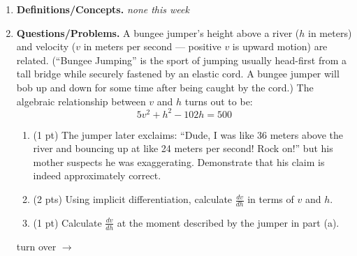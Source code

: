 \documentclass[11pt,letterpaper]{article}
\begin{document}
\begin{enumerate}
\item  \textbf{Definitions/Concepts.} \emph{none this week}

\vspace{1pc}
\item \textbf{Questions/Problems.}  \noindent A bungee jumper's height above a river ($h$ in meters) and velocity ($v$ in meters per
second --- positive $v$ is upward motion) are related. (``Bungee Jumping'' is the sport of jumping usually head-first from a tall
bridge while securely fastened by an elastic cord. A bungee jumper will bob up and down for some time after being caught by the
cord.)  The algebraic relationship between $v$ and $h$ turns out to be:
\[5v^2 + h^2 - 102h = 500\]

\begin{enumerate}
\item (1 pt)  The jumper later exclaims: ``Dude, I was like 36 meters above the river and bouncing up at like 24 meters per second! Rock on!'' but his mother suspects he was exaggerating. Demonstrate that his claim is indeed approximately correct. 

\vspace{3pc}
\item (2 pts)  Using implicit differentiation, calculate $\frac{dv}{dh}$ in terms of $v$ and $h$.

\vspace{5pc}
\item (1 pt)  Calculate $\frac{dv}{dh}$ at the moment described by the jumper in part (a).

\end{enumerate}

\vspace{5pc}
\begin{flushright}
 turn over $\rightarrow $
\end{flushright}


\end{enumerate}
\end{document}
